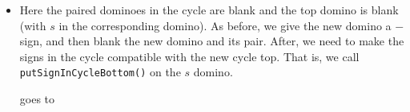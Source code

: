 \documentclass[12pt]{article}
\numberwithin{equation}{section}
\newcommand{\horizontalDominoRSShift}[4]{\filldraw [dominoRSStyle] (#2 - 1 + #4 + \eps, #1 - 1 + \eps) rectangle + (2 - \teps, 1 -\teps) node [dominoText] {$#3$};}
\newcommand{\verticalDominoRSShift}[4]{\filldraw [dominoRSStyle] (#2 - 1 + #4 + \eps,  #1 - 1 + \eps) rectangle + (1 - \teps,2 -\teps) node [dominoText] {$#3$};}
\begin{document}
\begin{itemize}
\begin{itemize}
\begin{itemize}
        \item Here the paired dominoes in the cycle are blank and the top domino is blank (with $s$ in the corresponding domino).
        As before, we give the new domino a $-$ sign, and then blank the new domino and its pair.
        After, we need to make the signs in the cycle compatible with the new cycle top.
        That is, we call \texttt{putSignInCycleBottom()} on the $s$ domino.
        \begin{figure}[H]
          \centering
        \end{figure}
        goes to
        \begin{figure}[H]
          \centering
\end{figure}
\end{itemize}
\end{itemize}
\end{itemize}
\end{document}
